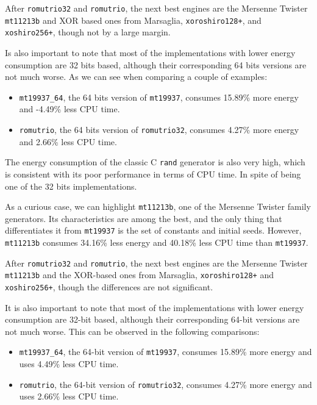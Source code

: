 \documentclass[sigconf]{acmart}
\begin{document}
After \texttt{romutrio32} and \texttt{romutrio}, the next best engines are the Mersenne Twister \texttt{mt11213b} and XOR based ones from Marsaglia, \texttt{xoroshiro128+}, and \texttt{xoshiro256+}, though not by a large margin.

Is also important to note that most of the implementations with lower energy consumption are 32 bits based, although their corresponding 64 bits versions are not much worse. As we can see when comparing a couple of examples:
\begin{itemize}
\item \texttt{mt19937\_64}, the 64 bits version of \texttt{mt19937}, consumes 15.89\% more energy and -4.49\% less CPU time.
\item \texttt{romutrio}, the 64 bits version of \texttt{romutrio32}, consumes 4.27\% more energy and 2.66\% less CPU time.
\end{itemize}

The energy consumption of the classic C \texttt{rand} generator is also very high, which is consistent with its poor performance in terms of CPU time. In spite of being one of the 32 bits implementations.

As a curious case, we can highlight \texttt{mt11213b}, one of the Mersenne Twister family generators. Its characteristics are among the best, and the only thing that differentiates it from \texttt{mt19937} is the set of constants and initial seeds. However, \texttt{mt11213b} consumes 34.16\% less energy and 40.18\% less CPU time than \texttt{mt19937}.


After \texttt{romutrio32} and \texttt{romutrio}, the next best engines are the Mersenne Twister \texttt{mt11213b} and the XOR-based ones from Marsaglia, \texttt{xoroshiro128+} and \texttt{xoshiro256+}, though the differences are not significant.

It is also important to note that most of the implementations with lower energy consumption are 32-bit based, although their corresponding 64-bit versions are not much worse. This can be observed in the following comparisons:

\begin{itemize}
    \item \texttt{mt19937\_64}, the 64-bit version of \texttt{mt19937}, consumes 15.89\% more energy and uses 4.49\% less CPU time.
    \item \texttt{romutrio}, the 64-bit version of \texttt{romutrio32}, consumes 4.27\% more energy and uses 2.66\% less CPU time.
\end{itemize}
\end{document}
